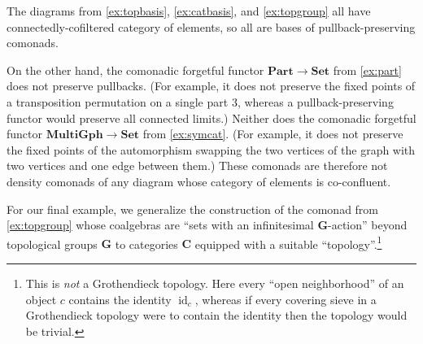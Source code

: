 \documentclass[11pt, oneside, article]{memoir}
\theoremstyle{plain}
\theoremstyle{definition}
\theoremstyle{remark}
\newenvironment{example}
{\renewcommand\qedsymbol{$\lrcorner$}%
  \pushQED{\qed}\myexample}
{\popQED\endmyexample}
\DeclareMathOperator{\id}{id}
\newcommand{\namedcat}[1]{\mathbf{#1}}
\newcommand{\cat}[1]{\mathbf{#1}}
\newcommand{\spa}[1]{\mathbf{#1}}
\newcommand{\Set}{\namedcat{Set}}
\newcommand{\MultiGph}{\namedcat{MultiGph}}
\newcommand{\Part}{\namedcat{Part}}
\newcommand{\bC}{\cat{C}}
\newcommand{\tG}{\spa{G}}
\begin{document}
\begin{example}
  The diagrams from \cref{ex:topbasis}, \cref{ex:catbasis}, and
  \cref{ex:topgroup} all have connectedly-cofiltered category of
  elements, so all are bases of pullback-preserving comonads.
  
  On the other hand, the comonadic forgetful functor $\Part \to \Set$
  from \cref{ex:part} does not preserve pullbacks.  (For example, it
  does not preserve the fixed points of a transposition permutation on
  a single part $3$, whereas a pullback-preserving functor would
  preserve all connected limits.)
  Neither does the comonadic forgetful functor $\MultiGph \to \Set$
  from \cref{ex:symcat}. (For example, it does not preserve the fixed
  points of the automorphism swapping the two vertices of the graph
  with two vertices and one edge between them.) These comonads are
  therefore not density comonads of any diagram whose category of
  elements is co-confluent.
\end{example}

For our final example, we generalize the construction of the comonad
from \cref{ex:topgroup} whose coalgebras are ``sets with an
infinitesimal $\tG$-action'' beyond topological groups $\tG$ to
categories $\bC$ equipped with a suitable ``topology''.\footnote{This
  is \emph{not} a Grothendieck topology. Here every ``open
  neighborhood'' of an object $c$ contains the identity $\id_c$,
  whereas if every covering sieve in a Grothendieck topology were to
  contain the identity then the topology would be trivial.}
\end{document}
